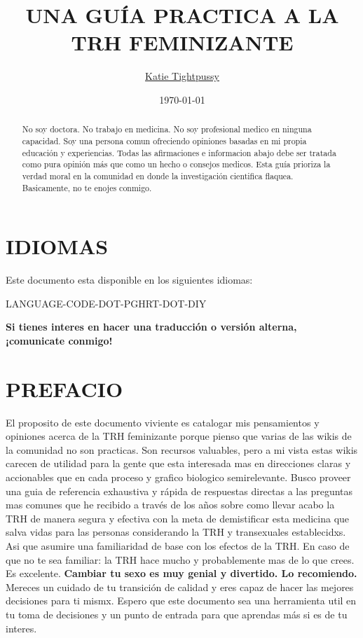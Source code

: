 \documentclass{article}
\title{UNA GUÍA PRACTICA A LA TRH FEMINIZANTE}
\author{\href{https://katea.gay/}{Katie Tightpussy}}
\date{\today}
\begin{document}
\maketitle
\tableofcontents
\begin{abstract}
  No soy doctora. No trabajo en medicina. No soy profesional medico en ninguna capacidad. Soy una persona comun ofreciendo opiniones basadas en mi propia educación y experiencias. Todas las afirmaciones e informacion abajo debe ser tratada como pura opinión más que como un hecho o consejos medicos. Esta guía prioriza la verdad moral en la comunidad en donde la investigación cientifica flaquea. Basicamente, no te enojes conmigo.
\end{abstract}

\section*{IDIOMAS}

Este documento esta disponible en los siguientes idiomas:

LANGUAGE-CODE-DOT-PGHRT-DOT-DIY

\noindent\textbf{Si tienes interes en hacer una traducción o versión alterna, ¡comunicate conmigo!}



\section{PREFACIO}

El proposito de este documento viviente es catalogar mis pensamientos y opiniones acerca de la TRH feminizante porque pienso que varias de las wikis de la comunidad no son practicas. Son recursos valuables, pero a mi vista estas wikis carecen de utilidad para la gente que esta interesada mas en direcciones claras y accionables que en cada proceso y grafico biologico semirelevante. Busco proveer una guia de referencia exhaustiva y rápida de respuestas directas a las preguntas mas comunes que he recibido a través de los años sobre como llevar acabo la TRH de manera segura y efectiva con la meta de demistificar esta medicina que salva vidas para las personas considerando la TRH y transexuales establecidxs. Asi que asumire una familiaridad de base con los efectos de la TRH. En caso de que no te sea familiar: la TRH hace mucho y probablemente mas de lo que crees. Es excelente. \textbf{Cambiar tu sexo es muy genial y divertido. Lo recomiendo.} Mereces un cuidado de tu transición de calidad y eres capaz de hacer las mejores decisiones para ti mismx. Espero que este documento sea una herramienta util en tu toma de decisiones y un punto de entrada para que aprendas más si es de tu interes.
\end{document}
